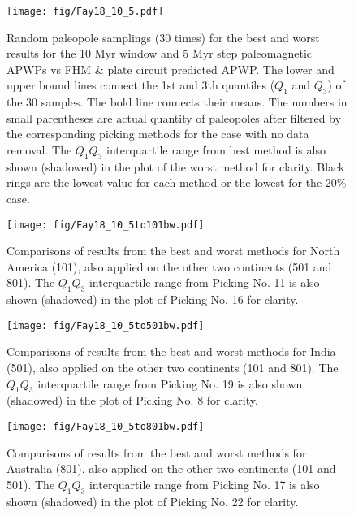 \begin{figure}
    \centering
        \texttt{[image: fig/Fay18\_10\_5.pdf]}
    \captionsetup{width=.95\textwidth}
    \caption{Random paleopole samplings (30 times) for the best and worst
	results for the 10 Myr window and 5 Myr step paleomagnetic APWPs vs FHM \&
	plate circuit predicted APWP\@. The lower and upper bound lines connect the
	1st and 3th quantiles ($Q_1$ and $Q_3$) of the 30 samples. The bold line
	connects their means. The numbers in small parentheses are actual quantity
	of paleopoles after filtered by the corresponding picking methods for the
	case with no data removal. The $Q_1$\textendash$Q_3$ interquartile range
	from best method is also shown (shadowed) in the plot of the worst method
	for clarity. Black rings are the lowest value for each method or the lowest
	for the 20\% case.}\label{Fig:Fay18_10_5bw}
\end{figure}

\begin{figure}
    \centering
        \texttt{[image: fig/Fay18\_10\_5to101bw.pdf]}
    \captionsetup{width=.95\textwidth}
    \caption{Comparisons of results from the best and worst methods for North
	America (101), also applied on the other two continents (501 and 801). The
	$Q_1$\textendash$Q_3$ interquartile range from Picking No. 11 is also shown
	(shadowed) in the plot of Picking No. 16 for clarity.}\label{Fig:Fay18_10_5to101bw}
\end{figure}

\begin{figure}
    \centering
        \texttt{[image: fig/Fay18\_10\_5to501bw.pdf]}
    \captionsetup{width=.95\textwidth}
	\caption{Comparisons of results from the best and worst methods for India
	(501), also applied on the other two continents (101 and 801). The
	$Q_1$\textendash$Q_3$ interquartile range from Picking No. 19 is also shown
	(shadowed) in the plot of Picking No. 8 for clarity.}\label{Fig:Fay18_10_5to501bw}
\end{figure}

\begin{figure}
    \centering
        \texttt{[image: fig/Fay18\_10\_5to801bw.pdf]}
    \captionsetup{width=.95\textwidth}
    \caption{Comparisons of results from the best and worst methods for
	Australia (801), also applied on the other two continents (101 and 501). The
	$Q_1$\textendash$Q_3$ interquartile range from Picking No. 17 is also shown
	(shadowed) in the plot of Picking No. 22 for clarity.}\label{Fig:Fay18_10_5to801bw}
\end{figure}

